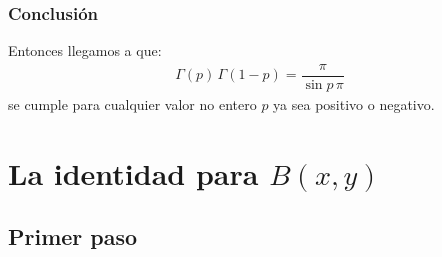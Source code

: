 \documentclass[12pt]{beamer}
\begin{document}
\begin{frame}
\frametitle{Conclusión}
Entonces llegamos a que:
\pause
\begin{align*}
\Gamma(p) \, \Gamma(1 - p) = \dfrac{\pi}{\sin p \, \pi}
\end{align*}
se cumple para cualquier valor no entero $p$ ya sea positivo o negativo.
\end{frame}

\section{La identidad para \texorpdfstring{$B(x, y)$}{B(x, y)}}
\subsection{Primer paso}
\end{document}
